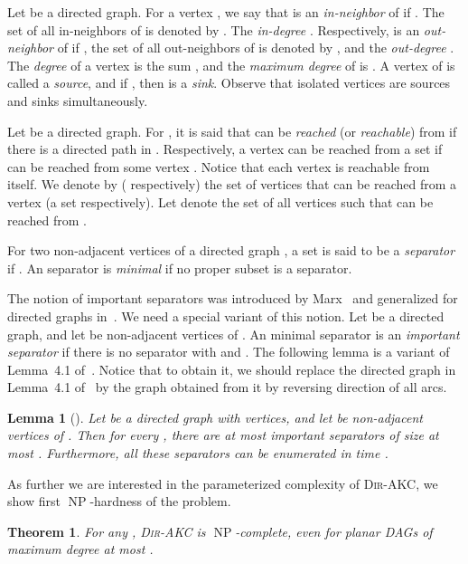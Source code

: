\documentclass[11pt,a4paper]{article}
\newtheorem{theorem}{Theorem}
\newtheorem{lemma}{Lemma}
\DeclareMathOperator{\operatorClassNP}{NP}
\newcommand{\classNP}{\ensuremath{\operatorClassNP}}
\newcommand{\DAKC}{\textsc{Dir-AKC}\xspace}
\begin{document}
Let  be a directed graph. For a vertex , we say that  is an \emph{in-neighbor} of  if . The
set of all in-neighbors of  is denoted by . The \emph{in-degree} . Respectively,  is an
\emph{out-neighbor} of  if , the set of all out-neighbors of  is denoted by , and the
\emph{out-degree} . The \emph{degree}  of a vertex  is the sum , and the
\emph{maximum degree} of  is . A vertex  of  is called a \emph{source},
and if  , then  is a \emph{sink}. Observe that isolated vertices are sources and sinks simultaneously.



Let  be a directed graph. For , it is said that  can be \emph{reached} (or \emph{reachable}) from  if
there is a directed  path in . Respectively, a vertex  can be reached from a set  if
 can be reached from some vertex . Notice that each vertex is reachable from itself. We denote by 
( respectively) the set of vertices that can be reached from a vertex  (a set  respectively).
Let  denote the set of all vertices  such that  can be reached from .

For two non-adjacent vertices  of a directed graph , a set  is said to be a
\emph{ separator} if . An  separator  is \emph{minimal} if no proper subset 
is a  separator.

The notion of important separators was introduced by Marx~\cite{Marx06} and generalized for directed graphs
in~\cite{ChitnisHM12}. We need a special variant of this notion. Let  be a directed graph, and let  be non-adjacent
vertices of . An minimal  separator is an \emph{important  separator} if there is no  separator  with
 and . The following lemma is a variant of Lemma~4.1 of~\cite{ChitnisHM12}.
Notice that to obtain it, we should replace the directed graph in Lemma~4.1 of~\cite{ChitnisHM12} by the graph obtained from
it by reversing direction of all arcs.


\begin{lemma}[\cite{ChitnisHM12}]\label{lem:imp-sep}
Let  be a directed graph with  vertices, and let  be non-adjacent vertices of . Then for every , there
are at most  important  separators of size at most . Furthermore, all these separators can be enumerated in time
.
\end{lemma}


As further we are interested in the parameterized complexity of \DAKC, we show first \classNP-hardness of the problem. 


\begin{theorem}\label{thm:NPc}
For any , \DAKC is \classNP-complete, even for planar DAGs of maximum degree at
most .
\end{theorem}
\end{document}
